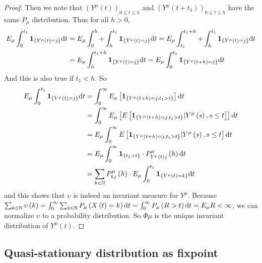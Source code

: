 \documentclass[12pt,a4paper]{scrartcl}
\numberwithin{equation}{section}
\newcommand{\N}{\mathbb{N}} %
\begin{document}
\begin{proof}
Then we note that $\left(Y^{\mu}\left(t\right)\right)_{0\leq t \leq h}$ and $\left(Y^{\mu}\left(t+t_1\right)\right)_{0\leq t \leq h}$ have the same $P_{\mu}$ distribution. Thus for all $h >0$,
\begin{align*}
E_{\mu} \int_{0}^{t_1} \textbf{1}_{\lbrace Y^{\mu}\left(t\right) = j\rbrace } \textnormal{d}t &= E_{\mu} \int_{0}^{h} + \int_{h}^{t_1} \textbf{1}_{\lbrace Y^{\mu}\left(t\right) = j\rbrace } \textnormal{d}t = E_{\mu} \int_{t_1}^{t_1+h} +   \int_{h}^{t_1}\textbf{1}_{\lbrace Y^{\mu}\left(t\right) = j\rbrace } \textnormal{d}t \\
&= E_{\mu} \int_{h}^{t_1+h} \textbf{1}_{\lbrace Y^{\mu}\left(t\right) = j\rbrace } \textnormal{d}t = E_{\mu} \int_{0}^{t_1} \textbf{1}_{\lbrace Y^{\mu}\left(t+h\right) = j\rbrace } \textnormal{d}t
\end{align*}
And this is also true if $t_1 < h$. So
\begin{align*}
E_{\mu} \int_{0}^{t_1} \textbf{1}_{\lbrace Y^{\mu}\left(t\right) = j\rbrace } \textnormal{d}t &= \int_{0}^{\infty} E_{\mu}\left[\textbf{1}_{\lbrace Y^{\mu}\left(t+h\right) = j, t_1 > t\rbrace }\right]\textnormal{d}t \\
&= \int_{0}^{\infty} E_{\mu}\left[E\left[\textbf{1}_{\lbrace Y^{\mu}\left(t+h\right) = j, t_1 > t\rbrace }| Y^{\mu}\left(s\right), s \leq t \right]\right]\textnormal{d}t \\
&= E_{\mu} \int_{0}^{\infty} E\left[\textbf{1}_{\lbrace Y^{\mu}\left(t+h\right) = j, t_1 > t\rbrace }| Y^{\mu}\left(s\right), s \leq t \right]\textnormal{d}t \\
&= E_{\mu} \int_{0}^{\infty}\textbf{1}_{\lbrace t_1>t\rbrace } \cdot P_{Y^{\mu}\left(t\right)j}^{\mu}\left(h\right) \textnormal{d}t \\
&= \sum_{k \in \N} P_{kj}^{\mu}\left(h\right) \cdot E_{\mu} \int_{0}^{t_1} \textbf{1}_{\lbrace Y^{\mu}\left(t\right) = k\rbrace } \textnormal{d}t
\end{align*}
and this shows that $ \upsilon $ is indeed an invariant measure for $ Y^{\mu} $. Because $\sum_{k \in \N} \upsilon\left(k\right) = \int_{0}^{\infty} \sum_{k \in \N} P_{\mu}\left(X\left(t\right) = k\right) \textnormal{d}t = \int_{0}^{\infty} P_{\mu}\left(R > t\right) \textnormal{d}t = E_{\mu} R < \infty $, we can normalize $ \upsilon $ to a probability distribution.
So $\Phi\mu$ is the unique invariant distribution of $ Y^{\mu}\left(t\right) $.

\end{proof}

\subsection{Quasi-stationary distribution as fixpoint} \label{sq:fixpointsareqsd}
 
\end{document}
